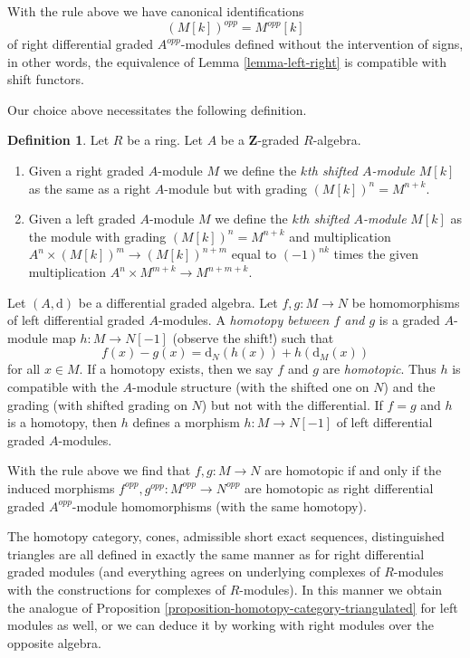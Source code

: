 \documentclass{stacks-project}
\theoremstyle{plain}
\theoremstyle{definition}
\newtheorem{definition}[subsection]{Definition}
\theoremstyle{remark}
\numberwithin{equation}{subsection}
\begin{document}
\medskip\noindent
With the rule above we have canonical identifications
$$
(M[k])^{opp} = M^{opp}[k]
$$
of right differential graded $A^{opp}$-modules
defined without the intervention of signs, in other words, the equivalence
of Lemma \ref{lemma-left-right} is compatible with shift functors.

\medskip\noindent
Our choice above necessitates the following definition.

\begin{definition}
\label{definition-shift-graded-module}
Let $R$ be a ring. Let $A$ be a $\mathbf{Z}$-graded $R$-algebra.
\begin{enumerate}
\item Given a right graded $A$-module $M$ we define the
{\it $k$th shifted $A$-module} $M[k]$ as the same as
a right $A$-module but with grading $(M[k])^n = M^{n + k}$.
\item Given a left graded $A$-module $M$ we define the
{\it $k$th shifted $A$-module} $M[k]$ as the module
with grading $(M[k])^n = M^{n + k}$ and multiplication
$A^n \times (M[k])^m \to (M[k])^{n + m}$
equal to $(-1)^{nk}$ times the given multiplication
$A^n \times M^{m + k} \to M^{n + m + k}$.
\end{enumerate}
\end{definition}

\noindent
Let $(A, \text{d})$ be a differential graded algebra. Let
$f, g : M \to N$ be homomorphisms of left differential graded $A$-modules.
A {\it homotopy between $f$ and $g$} is a graded $A$-module map
$h : M \to N[-1]$ (observe the shift!) such that
$$
f(x) - g(x) = \text{d}_N(h(x)) + h(\text{d}_M(x))
$$
for all $x \in M$. If a homotopy exists, then we say $f$ and $g$ are
{\it homotopic}. Thus $h$ is compatible with the $A$-module structure
(with the shifted one on $N$) and the grading (with shifted grading on $N$)
but not with the differential. If $f = g$ and $h$ is a homotopy, then
$h$ defines a morphism $h : M \to N[-1]$ of left differential
graded $A$-modules.

\medskip\noindent
With the rule above we find that $f, g : M \to N$ are homotopic if
and only if the induced morphisms
$f^{opp}, g^{opp} : M^{opp} \to N^{opp}$
are homotopic as right differential graded $A^{opp}$-module homomorphisms
(with the same homotopy).

\medskip\noindent
The homotopy category, cones, admissible short exact sequences,
distinguished triangles are all defined in exactly the same manner
as for right differential graded modules (and everything agrees
on underlying complexes of $R$-modules with the constructions for
complexes of $R$-modules). In this manner we obtain the analogue of
Proposition \ref{proposition-homotopy-category-triangulated}
for left modules as well, or we can deduce it by working
with right modules over the opposite algebra.
\end{document}
